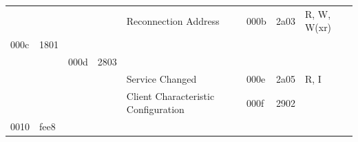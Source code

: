 \documentclass[conference]{IEEEtran}
\begin{document}
\begin{landscape}
\begin{table}[ht]
\begin{tabular}{@{}llllllll@{}}
                            &                             &                              &                              & Reconnection Address                                                                   & 000b                     & 2a03                             & R, W, W(xr)                                                                                                        \\
\rowcolor[HTML]{3166FF} 
{\color[HTML]{000000} 000c} & {\color[HTML]{000000} 1801} & {\color[HTML]{000000} }      & {\color[HTML]{000000} }      & {\color[HTML]{000000} }                                                                & {\color[HTML]{000000} }  & {\color[HTML]{000000} }          & {\color[HTML]{000000} }                                                                                            \\
                            &                             & \cellcolor[HTML]{FFFE65}000d & \cellcolor[HTML]{FFFE65}2803 & \cellcolor[HTML]{FFFE65}                                                               & \cellcolor[HTML]{FFFE65} & \cellcolor[HTML]{FFFE65}         & \cellcolor[HTML]{FFFE65}                                                                                           \\
                            &                             &                              &                              & Service Changed                                                                        & 000e                     & 2a05                             & R, I                                                                                                               \\
                            &                             &                              &                              & Client Characteristic Configuration                                                    & 000f                     & 2902                             &                                                                                                                    \\
\rowcolor[HTML]{3166FF} 
{\color[HTML]{000000} 0010} & {\color[HTML]{000000} fee8} & {\color[HTML]{000000} }      & {\color[HTML]{000000} }      & {\color[HTML]{000000} }                                                                & {\color[HTML]{000000} }  & {\color[HTML]{000000} }          & {\color[HTML]{000000} }                                                                                            \\

\end{tabular}
\end{table}
\end{landscape}
\end{document}
